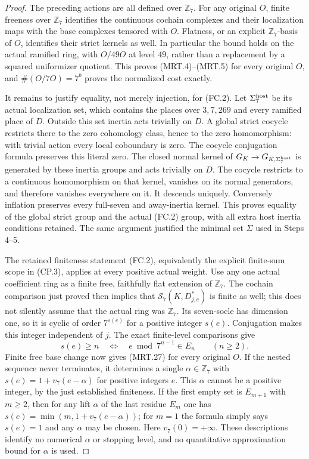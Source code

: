 \begin{proof}
The preceding actions are all defined over $\mathbb Z_7$.
For any original $O$, finite freeness over $\mathbb Z_7$ identifies
the continuous cochain complexes and their localization maps
with the base complexes tensored with $O$.  Flatness, or an
explicit $\mathbb Z_7$-basis of $O$, identifies their strict
kernels as well.  In particular the bound holds on the actual
ramified ring, with $O/49O$ at level $49$, rather than a replacement
by a squared uniformizer quotient.  This proves (MRT.4)--(MRT.5)
for every original $O$, and $\#(O/7O)=7^b$ proves the normalized
cost exactly.

It remains to justify equality, not merely injection, for (FC.2).
Let $\Sigma_7^{\rm host}$ be its actual localization set, which
contains the places over $3,7,269$ and every ramified place of $D$.
Outside this set inertia acts trivially on $D$.  A global strict
cocycle restricts there to the zero cohomology class, hence to the
zero homomorphism: with trivial action every local coboundary is
zero.  The cocycle conjugation formula preserves this literal zero.
The closed normal kernel of $G_K\to G_{K,\Sigma_7^{\rm host}}$
is generated by these inertia groups and acts trivially on $D$.
The cocycle restricts to a continuous homomorphism on that kernel,
vanishes on its normal generators, and therefore vanishes everywhere
on it.  It descends uniquely.  Conversely inflation preserves every
full-seven and away-inertia kernel.  This proves equality of the
global strict group and the actual (FC.2) group, with all extra host
inertia conditions retained.  The same argument justified the
minimal set $\Sigma$ used in Steps 4--5.

The retained finiteness statement (FC.2), equivalently the explicit
finite-sum scope in (CP.3), applies at every positive actual weight.
Use any one actual coefficient ring as a finite free, faithfully
flat extension of $\mathbb Z_7$.  The cochain comparison just proved
then implies that $\mathcal S_7(K,D_{j,e}^*)$ is finite as well;
this does not silently assume that the actual ring was $\mathbb Z_7$.
Its seven-socle has dimension one, so it is cyclic of order
$7^{s(e)}$ for a positive integer $s(e)$.  Conjugation makes this
integer independent of $j$.  The exact finite-level comparisons give
\[
 s(e)\geq n\quad\Longleftrightarrow\quad
                   e\bmod7^{n-1}\in E_n\qquad(n\geq2).
 \tag{MRT.36}
\]
Finite free base change now gives (MRT.27) for every original $O$.
If the nested sequence never terminates, it determines a single
$\alpha\in\mathbb Z_7$ with
$s(e)=1+v_7(e-\alpha)$ for positive integers $e$.
This $\alpha$ cannot be a positive integer, by the just established
finiteness.  If the first empty set is $E_{m+1}$ with $m\geq2$, then for any lift
$\alpha$ of the last residue $E_m$ one has
$s(e)=\min(m,1+v_7(e-\alpha))$; for $m=1$ the formula simply says
$s(e)=1$ and any $\alpha$ may be chosen.  Here $v_7(0)=+\infty$.
These descriptions identify no numerical $\alpha$ or stopping level,
and no quantitative approximation bound for $\alpha$ is used.



\end{proof}

